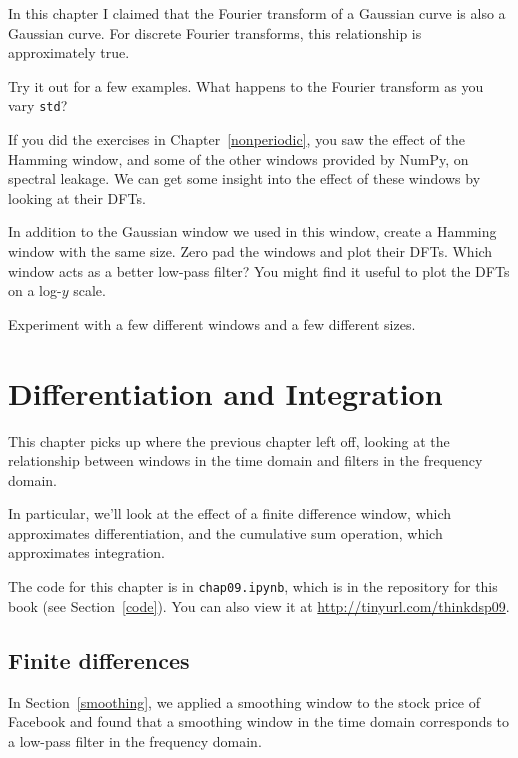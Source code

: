 \documentclass[12pt]{book}
\begin{document}
\begin{exercise}
In this chapter I claimed that the Fourier transform of a Gaussian
curve is also a Gaussian curve.  For discrete Fourier transforms,
this relationship is approximately true.

Try it out for a few examples.  What happens to the Fourier transform
as you vary {\tt std}?
\end{exercise}


\begin{exercise}
If you did the exercises in Chapter~\ref{nonperiodic}, you saw the
effect of the Hamming window, and some of the other windows provided
by NumPy, on spectral leakage.  We can get some insight into the
effect of these windows by looking at their DFTs.

In addition to the Gaussian window we used in this window, create a
Hamming window with the same size.  Zero pad the windows and plot
their DFTs.  Which window acts as a better low-pass filter?  You might
find it useful to plot the DFTs on a log-$y$ scale.

Experiment with a few different windows and a few different sizes.
\end{exercise}



\chapter{Differentiation and Integration}
\label{diffint}

This chapter picks up where the previous chapter left off,
looking at the relationship between windows in the time domain
and filters in the frequency domain.

In particular, we'll look at the effect of a finite difference
window, which approximates differentiation, and the cumulative
sum operation, which approximates integration.

The code for this chapter is in {\tt chap09.ipynb}, which is in the
repository for this book (see Section~\ref{code}).
You can also view it at \url{http://tinyurl.com/thinkdsp09}.


\section{Finite differences}
\label{diffs}

In Section~\ref{smoothing}, we applied a smoothing window to
the stock price of Facebook and found that a smoothing
window in the time domain corresponds to a low-pass filter in
the frequency domain.
\end{document}
